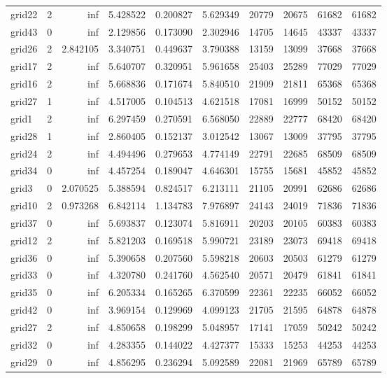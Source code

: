 \begin{longtable}{|l|r|r|r|r|r|r|r|r|r|}
grid22 & 2 & inf & 5.428522 & 0.200827 & 5.629349 & 20779 & 20675 & 61682 & 61682 \\
grid43 & 0 & inf & 2.129856 & 0.173090 & 2.302946 & 14705 & 14645 & 43337 & 43337 \\
grid26 & 2 & 2.842105 & 3.340751 & 0.449637 & 3.790388 & 13159 & 13099 & 37668 & 37668 \\
grid17 & 2 & inf & 5.640707 & 0.320951 & 5.961658 & 25403 & 25289 & 77029 & 77029 \\
grid16 & 2 & inf & 5.668836 & 0.171674 & 5.840510 & 21909 & 21811 & 65368 & 65368 \\
grid27 & 1 & inf & 4.517005 & 0.104513 & 4.621518 & 17081 & 16999 & 50152 & 50152 \\
grid1 & 2 & inf & 6.297459 & 0.270591 & 6.568050 & 22889 & 22777 & 68420 & 68420 \\
grid28 & 1 & inf & 2.860405 & 0.152137 & 3.012542 & 13067 & 13009 & 37795 & 37795 \\
grid24 & 2 & inf & 4.494496 & 0.279653 & 4.774149 & 22791 & 22685 & 68509 & 68509 \\
grid34 & 0 & inf & 4.457254 & 0.189047 & 4.646301 & 15755 & 15681 & 45852 & 45852 \\
grid3 & 0 & 2.070525 & 5.388594 & 0.824517 & 6.213111 & 21105 & 20991 & 62686 & 62686 \\
grid10 & 2 & 0.973268 & 6.842114 & 1.134783 & 7.976897 & 24143 & 24019 & 71836 & 71836 \\
grid37 & 0 & inf & 5.693837 & 0.123074 & 5.816911 & 20203 & 20105 & 60383 & 60383 \\
grid12 & 2 & inf & 5.821203 & 0.169518 & 5.990721 & 23189 & 23073 & 69418 & 69418 \\
grid36 & 0 & inf & 5.390658 & 0.207560 & 5.598218 & 20603 & 20503 & 61279 & 61279 \\
grid33 & 0 & inf & 4.320780 & 0.241760 & 4.562540 & 20571 & 20479 & 61841 & 61841 \\
grid35 & 0 & inf & 6.205334 & 0.165265 & 6.370599 & 22361 & 22235 & 66052 & 66052 \\
grid42 & 0 & inf & 3.969154 & 0.129969 & 4.099123 & 21705 & 21595 & 64878 & 64878 \\
grid27 & 2 & inf & 4.850658 & 0.198299 & 5.048957 & 17141 & 17059 & 50242 & 50242 \\
grid32 & 0 & inf & 4.283355 & 0.144022 & 4.427377 & 15333 & 15253 & 44253 & 44253 \\
grid29 & 0 & inf & 4.856295 & 0.236294 & 5.092589 & 22081 & 21969 & 65789 & 65789 \\

\end{longtable}
